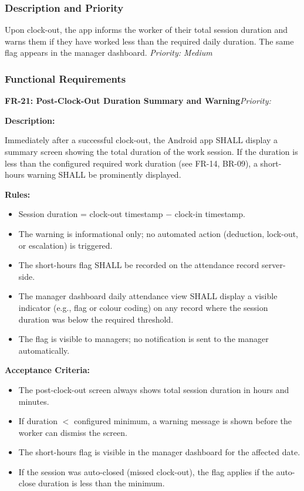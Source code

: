 \documentclass[12pt, a4paper]{article}
\newcommand{\frblock}[2]{%
    \noindent\textbf{#1}\hfill\textit{Priority: #2}%
    \par\smallskip%
}
\newcommand{\srsfield}[1]{\noindent\textbf{#1:}\par}
\begin{document}
\subsubsection*{Description and Priority}
Upon clock-out, the app informs the worker of their total session
duration and warns them if they have worked less than the required daily
duration. The same flag appears in the manager dashboard.
\hfill \textit{Priority: Medium}

\subsubsection*{Functional Requirements}

\frblock{FR-21: Post-Clock-Out Duration Summary and Warning}{}

\srsfield{Description}
Immediately after a successful clock-out, the Android app SHALL display
a summary screen showing the total duration of the work session. If the
duration is less than the configured required work duration (see FR-14,
BR-09), a short-hours warning SHALL be prominently displayed.

\srsfield{Rules}
\begin{itemize}
    \item Session duration = clock-out timestamp $-$ clock-in timestamp.
    \item The warning is informational only; no automated action
          (deduction, lock-out, or escalation) is triggered.
    \item The short-hours flag SHALL be recorded on the attendance record
          server-side.
    \item The manager dashboard daily attendance view SHALL display a
          visible indicator (e.g., flag or colour coding) on any record
          where the session duration was below the required threshold.
    \item The flag is visible to managers; no notification is sent to
          the manager automatically.
\end{itemize}

\srsfield{Acceptance Criteria}
\begin{itemize}
    \item The post-clock-out screen always shows total session duration
          in hours and minutes.
    \item If duration $<$ configured minimum, a warning message is shown
          before the worker can dismiss the screen.
    \item The short-hours flag is visible in the manager dashboard for
          the affected date.
    \item If the session was auto-closed (missed clock-out), the flag
          applies if the auto-close duration is less than the minimum.
\end{itemize}
\end{document}
